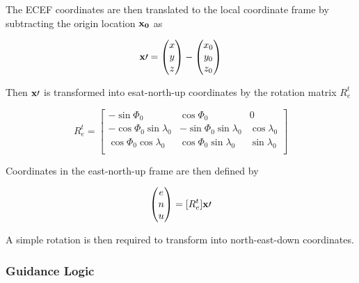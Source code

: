\documentclass{aiaa}
\begin{document}
The ECEF coordinates are then translated to the local coordinate frame by subtracting the origin location $\bold{x_0}$ as

\begin{equation}
\bold{x\prime} = 
	\begin{pmatrix}
    	x \\
        y \\ 
        z \\
    \end{pmatrix}
    -
    \begin{pmatrix}
    	x_0 \\
        y_0 \\ 
        z_0 \\
    \end{pmatrix}
\end{equation}
   
   
   Then $\bold{x\prime}$ is transformed into esat-north-up coordinates by the rotation matrix $R_e^t$
   
   \begin{equation}
   	R_e^t = 
    	\begin{bmatrix}
        -\sin{\Phi_0} & \cos{\Phi_0} & 0 \\
        -\cos{\Phi_0}\sin{\lambda_0} & -\sin{\Phi_0}\sin{\lambda_0} & \cos{\lambda_0}\\
        \cos{\Phi_0}\cos{\lambda_0} & \cos{\Phi_0}\sin{\lambda_0} & \sin{\lambda_0}\\
        \end{bmatrix}
    \end{equation}
    
    Coordinates in the east-north-up frame are then defined by
    
    \begin{equation}
    \begin{pmatrix}
    	e \\ 
        n \\
        u \\
    \end{pmatrix}
    =[R_e^t]\bold{x\prime}
    \end{equation}
    
    A simple rotation is then required to transform into north-east-down coordinates.

\subsubsection{Guidance Logic}
\end{document}
